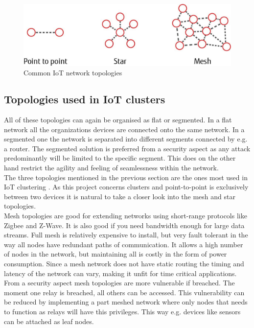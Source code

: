 \begin{figure}[h]
    \centering
    \includegraphics[width=.9\linewidth]{images/network_topologies.jpg}
    \caption{Common IoT network topologies}
    \label{fig:network_topologies}
\end{figure}
  
\subsection{Topologies used in IoT clusters}

All of these topologies can again be organised as flat or segmented. In a flat network all the organizations devices are connected onto the same network. In a segmented one the network is separated into different segments connected by e.g. a router. The segmented solution is preferred from a security aspect as any attack predominantly will be limited to the specific segment. This does on the other hand restrict the agility and feeling of seamlessness within the network.\\

The three topologies mentioned in the previous section are the ones most used in IoT clustering \cite{oreilly:IoT_topology}\cite{linklabs:IoT_topology}. As this project concerns clusters and point-to-point is exclusively between two devices it is natural to take a closer look into the mesh and star topologies.\\ 

Mesh topologies are good for extending networks using short-range protocols like Zigbee and Z-Wave. It is also good if you need bandwidth enough for large data streams. Full mesh is relatively expensive to install, but very fault tolerant in the way all nodes have redundant paths of communication. It allows a high number of nodes in the network, but maintaining all is costly in the form of power consumption. Since a mesh network does not have static routing the timing and latency of the network can vary, making it unfit for time critical applications.\\

From a security aspect mesh topologies are more vulnerable if breached. The moment one relay is breached, all others can be accessed. This vulnerability can be reduced by implementing a part meshed network where only nodes that needs to function as relays will have this privileges. This way e.g. devices like sensors can be attached as leaf nodes. \\

